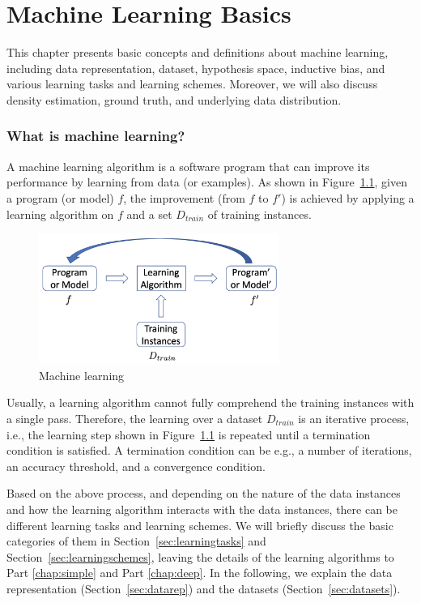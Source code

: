 \chapter{Machine Learning Basics}\label{chap:basics}

This chapter presents basic concepts and definitions about machine learning, including data representation, dataset, hypothesis space, inductive bias, and various learning tasks and learning schemes. Moreover, we will also discuss density estimation, ground truth, and underlying data distribution.

\subsection*{What is machine learning?} 

A machine learning algorithm is a software program that can improve its performance by learning from data (or examples).  As shown in Figure~\ref{fig:learning}, given a program (or model) $f$, the improvement (from $f$ to $f'$) is achieved by applying a learning algorithm on $f$ and a set $D_{train}$ of training instances.  

\begin{figure}[!htbp]
    \centering
    \includegraphics[width=0.7\textwidth]{images/foundations/learning.png}
    \caption{Machine learning}
    \label{fig:learning}
\end{figure}

Usually, a learning algorithm cannot fully comprehend the training instances with a single pass. Therefore, the learning over a dataset $D_{train}$ is an iterative process, i.e., the learning step shown in Figure~\ref{fig:learning} is repeated until a termination condition is satisfied. A termination condition can be e.g., a number of iterations, an accuracy threshold, and a convergence condition. 

Based on the above process, and depending on the nature of the data instances and how the learning algorithm interacts with the data instances, there can be different learning tasks and learning schemes. We will briefly discuss the basic categories of them in Section~\ref{sec:learningtasks} and Section~\ref{sec:learningschemes}, leaving the details of the learning algorithms to 
Part \ref{chap:simple} and Part \ref{chap:deep}. In the following, we explain the data representation (Section~\ref{sec:datarep}) and the datasets (Section~\ref{sec:datasets}). 


